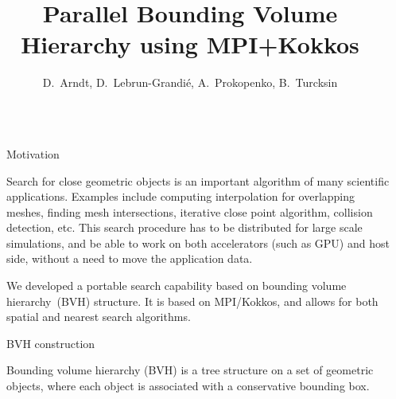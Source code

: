 \documentclass[final,hyperref={pdfpagelabels=false}]{beamer}
\title{\huge Parallel Bounding Volume Hierarchy using MPI+Kokkos}
\author{D.~Arndt, D.~Lebrun-Grandi{\'e}, A.~Prokopenko, B.~Turcksin}
\institute{Oak Ridge National Laboratory}
\begin{document}

\begin{frame}[t,fragile]

\begin{columns}[t]

\begin{column}{.02\textwidth}\end{column}

\begin{column}{.450\textwidth}

\begin{block}{\centering Motivation}

  Search for close geometric objects is an important algorithm of many
  scientific applications.
  Examples include computing interpolation for overlapping meshes, finding
  mesh intersections, iterative close point algorithm, collision detection, etc.
  This search procedure has to be distributed for large scale simulations, and
  be able to work on both accelerators (such as GPU) and host side, without a
  need to move the application data.

  We developed a portable search capability based on bounding volume
  hierarchy~(BVH) structure. It is based on MPI/Kokkos, and allows for both
  spatial and nearest search algorithms.
\end{block}

\begin{block}{\centering BVH construction}

  Bounding volume hierarchy (BVH) is a tree structure on a set of geometric
  objects, where each object is associated with a conservative bounding box.


\end{block}
\end{column}
\end{columns}
\end{frame}
\end{document}
